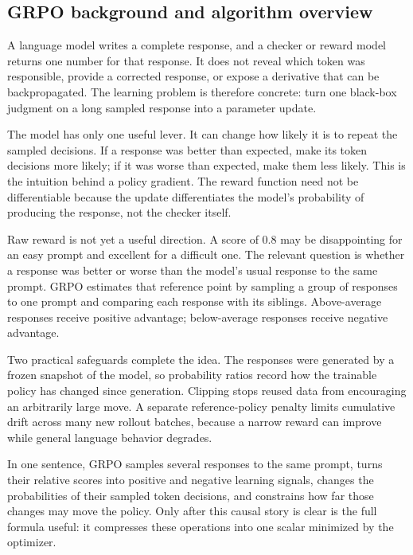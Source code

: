 \subsection{GRPO background and algorithm overview}

A language model writes a complete response, and a checker or reward model returns one
number for that response. It does not reveal which token was responsible, provide a
corrected response, or expose a derivative that can be backpropagated. The learning
problem is therefore concrete: turn one black-box judgment on a long sampled response
into a parameter update.

The model has only one useful lever. It can change how likely it is to repeat the sampled
decisions. If a response was better than expected, make its token decisions more likely;
if it was worse than expected, make them less likely. This is the intuition behind a
policy gradient. The reward function need not be differentiable because the update
differentiates the model's probability of producing the response, not the checker itself.

Raw reward is not yet a useful direction. A score of $0.8$ may be disappointing for an
easy prompt and excellent for a difficult one. The relevant question is whether a response
was better or worse than the model's usual response to the same prompt. GRPO estimates
that reference point by sampling a group of responses to one prompt and comparing each
response with its siblings. Above-average responses receive positive advantage;
below-average responses receive negative advantage.

Two practical safeguards complete the idea. The responses were generated by a frozen
snapshot of the model, so probability ratios record how the trainable policy has changed
since generation. Clipping stops reused data from encouraging an arbitrarily large move.
A separate reference-policy penalty limits cumulative drift across many new rollout
batches, because a narrow reward can improve while general language behavior degrades.

In one sentence, GRPO samples several responses to the same prompt, turns their relative
scores into positive and negative learning signals, changes the probabilities of their
sampled token decisions, and constrains how far those changes may move the policy. Only
after this causal story is clear is the full formula useful: it compresses these operations
into one scalar minimized by the optimizer.

